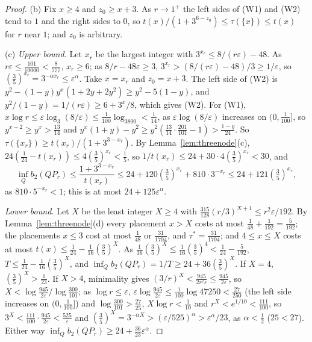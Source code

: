 \documentclass[11pt]{article}
\begin{document}
\begin{proof}
(b) Fix $x\ge4$ and $z_0\ge x+3$.  As $r\to1^+$ the left sides of (W1) and
(W2) tend to $1$ and the right sides to $0$, so
$t(x)/(1+3^{6-z_0})\le\tau(\{x\})\le t(x)$ for $r$ near $1$; and $z_0$ is
arbitrary.

(c) \emph{Upper bound.}  Let $x_r$ be the largest integer with
$3^{x_r}\le8/(r\varepsilon)-48$.  As $r\varepsilon\le\tfrac{101}{10000}<\tfrac8{777}$,
$x_r\ge6$; as $8/r-48\varepsilon\ge3$, $3^{x_r}>(8/(r\varepsilon)-48)/3\ge1/\varepsilon$,
so $(\tfrac35)^{x_r}=3^{-\alpha x_r}\le\varepsilon^\alpha$.  Take $x=x_r$ and
$z_0=x+3$.  The left side of (W2) is
$y^2-(1-y)y^x(1+2y+2y^2)\ge y^2-5(1-y)$, and
$y^2/(1-y)=1/(r\varepsilon)\ge6+3^x/8$, which gives (W2).  For (W1),
$x\log r\le\varepsilon\log_3(8/\varepsilon)\le\tfrac1{100}\log_3800<\tfrac1{14}$,
as $\varepsilon\log(8/\varepsilon)$ increases on $(0,\tfrac1{100}]$, so
$y^{x-2}\ge y^x>\tfrac{13}{14}$ and
$y^x(1+y)-y^2\ge y^2(\tfrac{13}{14}\cdot\tfrac{201}{101}-1)>\tfrac{1-y}{24}$.
So $\tau(\{x_r\})\ge t(x_r)/(1+3^{3-x_r})$.  By
Lemma~\ref{lem:threenode}(c), $24(\tfrac1{24}-t(x_r))\le4(\tfrac35)^{x_r}<\tfrac15$,
so $1/t(x_r)\le24+30\cdot4(\tfrac35)^{x_r}<30$, and
\[
  \inf_Qb_2(QP_r)\le\frac{1+3^{3-x_r}}{t(x_r)}
  \le24+120(\tfrac35)^{x_r}+810\cdot3^{-x_r}\le24+121(\tfrac35)^{x_r},
\]
as $810\cdot5^{-x_r}<1$; this is at most $24+125\varepsilon^\alpha$.

\emph{Lower bound.}  Let $X$ be the least integer $X\ge4$ with
$\tfrac{315}{128}(r/3)^{X+1}\le r^2\varepsilon/192$.  By
Lemma~\ref{lem:threenode}(d) every placement $x>X$ costs at most
$\tfrac1{48}+\tfrac1{192}=\tfrac5{192}$; the placements $x\le3$ cost at most
$\tfrac1{48}$ or $\tfrac{31}{1704}$, and $\tau^*=\tfrac{31}{1704}$; and
$4\le x\le X$ costs at most $t(x)\le\tfrac1{24}-\tfrac1{16}(\tfrac35)^X$.  As
$\tfrac1{16}(\tfrac35)^X\le\tfrac1{16}(\tfrac35)^4<\tfrac1{24}-\tfrac5{192}$,
$T\le\tfrac1{24}-\tfrac1{16}(\tfrac35)^X$, and
$\inf_Qb_2(QP_r)=1/T\ge24+36(\tfrac35)^X$.  If $X=4$, $(\tfrac35)^X>\tfrac1{23}$.
If $X>4$, minimality gives $(3/r)^X<\tfrac{945}{2r^2\varepsilon}\le\tfrac{945}{2\varepsilon}$,
so $X<\log\tfrac{945}{2\varepsilon}/\log\tfrac{300}{101}$; as
$\log r\le\varepsilon$, $\varepsilon\log\tfrac{945}{2\varepsilon}\le\tfrac1{100}\log47250<\tfrac{27}{250}$
(the left side increases on $(0,\tfrac1{100}]$) and $\log\tfrac{300}{101}>\tfrac{27}{25}$,
$X\log r<\tfrac1{10}$ and $r^X<e^{1/10}<\tfrac{111}{100}$, so $3^X<\tfrac{111}{100}\cdot\tfrac{945}{2\varepsilon}<\tfrac{525}\varepsilon$
and $(\tfrac35)^X=3^{-\alpha X}>(\varepsilon/525)^\alpha>\varepsilon^\alpha/23$,
as $\alpha<\tfrac12$ ($25<27$).  Either way $\inf_Qb_2(QP_r)\ge24+\tfrac{36}{23}\varepsilon^\alpha$.


\end{proof}
\end{document}

